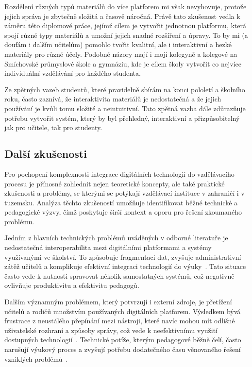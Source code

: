 Rozdělení různých typů materiálů do více platforem mi však nevyhovuje, protože jejich správa je zbytečně složitá a časově náročná.
Právě tato zkušenost vedla k záměru této diplomové práce, jejímž cílem je vytvořit jednotnou platformu, která spojí různé typy materiálů a umožní jejich snadné rozšíření a úpravy.
To by mi (a doufám i dalším učitelům) pomohlo tvořit kvalitní, ale i interaktivní a hezké materiály pro různé účely.
Podobné názory mají i moji kolegyně a kolegové na Smíchovské průmyslové škole a gymnáziu, kde je cílem školy vytvořit co nejvíce individuální vzdělávání pro každého studenta.

Ze zpětných vazeb studentů, které pravidelně sbírám na konci pololetí a školního roku, často zaznívá, že interaktivita materiálů je nedostatečná a že jejich používání je kvůli tomu složité a neintuitivní.
Tato zpětná vazba dále zdůrazňuje potřebu vytvořit systém, který by byl přehledný, interaktivní a přizpůsobitelný jak pro učitele, tak pro studenty.

\subsection{Další zkušenosti}

Pro pochopení komplexnosti integrace digitálních technologií do vzdělávacího procesu je přínosné zohlednit nejen teoretické koncepty, ale také praktické zkušenosti a problémy, se kterými se potýkají vzdělávací instituce v zahraničí i v tuzemsku. 
Analýza těchto zkušeností umožňuje identifikovat běžné technické a pedagogické výzvy, čímž poskytuje širší kontext a oporu pro řešení zkoumaného problému.

Jedním z hlavních technických problémů uváděných v odborné literatuře je nedostatečná interoperabilita mezi digitálními platformami a systémy využívanými ve školství. 
To způsobuje fragmentaci dat, zvyšuje administrativní zátěž učitelů a komplikuje efektivní integraci technologií do výuky~\cite{powerschool2023}. 
Tato situace často vede k nutnosti spravovat několik samostatných systémů, což negativně ovlivňuje produktivitu a efektivitu pedagogů.

Dalším významným problémem, který potvrzují i externí zdroje, je přetížení učitelů a rodičů množstvím používaných digitálních platforem. 
Výsledkem bývá frustrace z neustálého přepínání mezi nástroji, které navíc mohou mít odlišné uživatelské rozhraní a způsoby správy, což vede k neefektivnímu využití dostupných technologií~\cite{guardian2025}. 
Technické potíže, kterým pedagogové běžně čelí, často narušují výukový proces a zvyšují potřebu dodatečného času věnovaného řešení vzniklých problémů~\cite{reddit2023}.

